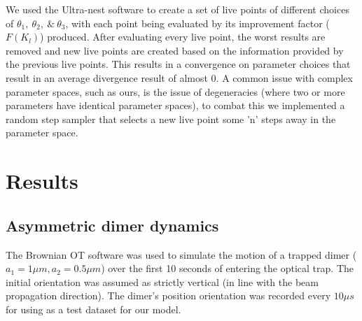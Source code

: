 \documentclass[final,3p, twocolumn]{elsarticle}
\begin{document}
We used the Ultra-nest software to create a set of live points of different choices of $\theta_1, \ \theta_2, \ \& \ \theta_3$, with each point being evaluated by its improvement factor ($F(K_l)$) produced. After evaluating every live point, the worst results are removed and new live points are created based on the information provided by the previous live points. This results in a convergence on parameter choices that result in an average divergence result of almost 0. A common issue with complex parameter spaces, such as ours, is the issue of degeneracies (where two or more parameters have identical parameter spaces), to combat this we implemented a random step sampler that selects a new live point some 'n' steps away in the parameter space.
 
\section{Results}
\label{3}
\subsection{Asymmetric dimer dynamics}
\label{3.1}
The Brownian OT software was used to simulate the motion of a trapped dimer ($a_1=1\mu m, a_2=0.5\mu m$) over the first 10 seconds of entering the optical trap. The initial orientation was assumed as strictly vertical (in line with the beam propagation direction). The dimer's position orientation was recorded every $10 \mu s$ for using as a test dataset for our model. 
\end{document}

